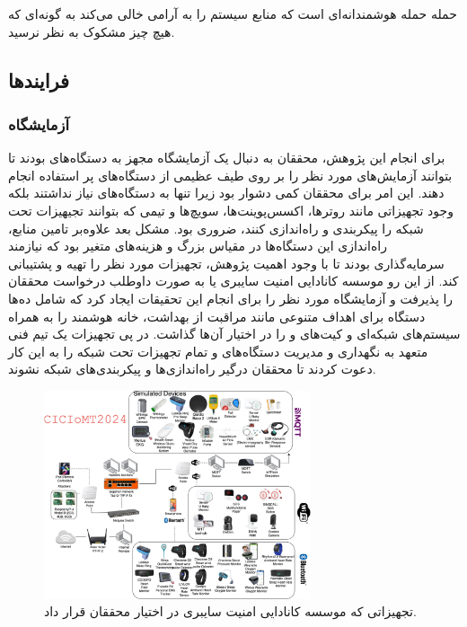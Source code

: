 حمله  حمله هوشمندانه‌ای است که منابع سیستم را به آرامی خالی می‌کند
به گونه‌ای که هیچ چیز مشکوک به نظر نرسید.

\subsection{فرایند‌ها}

\subsubsection{آزمایشگاه }

برای انجام این پژوهش، محققان به دنبال یک آزمایشگاه مجهز به دستگاه‌های 
بودند تا بتوانند آزمایش‌های مورد نظر را بر روی طیف عظیمی از دستگاه‌های پر
استفاده انجام دهند. این امر برای محققان کمی دشوار بود زیرا تنها به دستگاه‌های
 نیاز نداشتند بلکه وجود تجهیزاتی مانند روتر‌ها، اکسس‌پوینت‌ها، سویچ‌ها و
تیمی که بتوانند تجیهیزات تحت شبکه را پیکربندی و راه‌اندازی کنند، ضروری بود. مشکل
بعد علاوه‌بر تامین منابع، راه‌اندازی این دستگاه‌ها در مقیاس بزرگ و هزینه‌های
متغیر بود که نیازمند سرمایه‌گذاری بودند تا با وجود اهمیت پژوهش، تجهیزات مورد نظر
را تهیه و پشتیبانی کند. از این رو موسسه کانادایی امنیت سایبری یا  به
صورت داوطلب درخواست محققان را پذیرفت و آزمایشگاه مورد نظر را برای انجام این
تحقیقات ایجاد کرد که شامل ده‌ها دستگاه  برای اهداف متنوعی مانند مراقبت
از بهداشت، خانه هوشمند را به همراه سیستم‌های شبکه‌ای و کیت‌های  و
 را در اختیار آن‌ها گذاشت. در پی تجهیزات یک تیم فنی متعهد به نگهداری و
مدیریت دستگاه‌های  و تمام تجهیزات تحت شبکه را به این کار دعوت کردند تا
محققان درگیر راه‌اندازی‌ها و پیکربندی‌های شبکه نشوند.

\begin{figure}[H]
  \centering
  \includegraphics[width=0.7\textwidth]{./figures/fig-3.jpg}
  \caption{تجهیزاتی که موسسه کانادایی امنیت سایبری در اختیار محققان قرار داد.}
  \label{fig:cicIotLab}
\end{figure}

